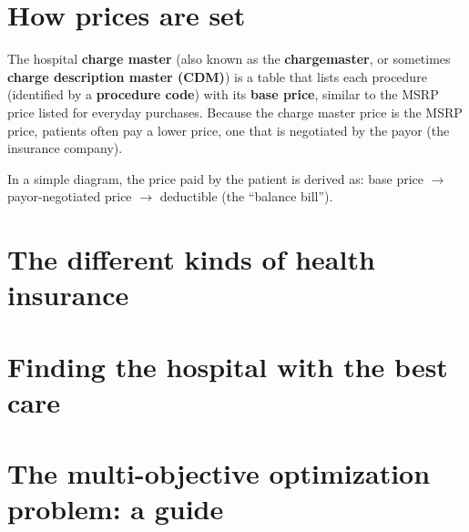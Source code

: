 \documentclass{article}
\begin{document}
\section{How prices are set}

The hospital {\bf charge master} (also known as the {\bf chargemaster}, or sometimes {\bf charge description master (CDM)}) is a table that lists each procedure (identified by a {\bf procedure code}) with its {\bf base price}, similar to the MSRP price listed for everyday purchases. Because the charge master price is the MSRP price, patients often pay a lower price, one that is negotiated by the payor (the insurance company).

In a simple diagram, the price paid by the patient is derived as: base price $\rightarrow$ payor-negotiated price $\rightarrow$ deductible (the ``balance bill'').

\section{The different kinds of health insurance}

\section{Finding the hospital with the best care}

\section{The multi-objective optimization problem: a guide}

\printbibliography
\end{document}

